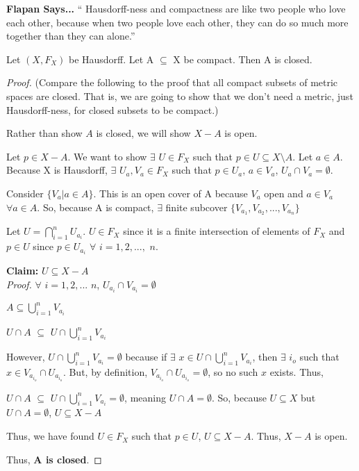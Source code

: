 \textbf{Flapan Says...} `` Hausdorff-ness and compactness are like two people who love each other, because when two people love each other, they can do so much more together than they can alone.'' \\
\begin{theorem}
	Let $(X, F_X)$ be Hausdorff. Let A $\subseteq$ X be compact. Then A is closed. 
\end{theorem}
\begin{proof}
	(Compare the following to the proof that all compact subsets of metric spaces are closed. That is, we are going to show that we don't need a metric, just Hausdorff-ness, for closed subsets to be compact.)
	
	Rather than show $A$ is closed, we will show $X-A$ is open.
	
	Let $p \in X-A$. We want to show $\exists$ $U \in F_X$ such that $p \in U \subseteq X\setminus A$. Let $a \in A$. Because X is Hausdorff, $\exists$ $U_a, V_a \in F_X$ such that $p \in U_a$, $a \in V_a$, $U_a \cap V_a = \emptyset$.
	
	Consider $\{ V_a | a \in A\}$. This is an open cover of A because $V_a$ open and $a \in V_a$ $\forall a \in A$. So, because A is compact, $\exists$ finite subcover $\{ V_{a_1}, V_{a_2}, ..., V_{a_n}\}$
	
	Let $U = \bigcap_{i=1}^{n} U_{a_i}$. $U \in F_X$ since it is a finite intersection of elements of $F_X$ and $p \in U$ since $p \in U_{a_i}$ $\forall$ $i=1, 2, ...,$ $n$.
	
	\textbf{Claim:} $U \subseteq X-A$\\
	\emph{Proof.} $\forall$ $i=1, 2, ...$ $n$, $U_{a_i} \cap V_{a_i} = \emptyset$
	
	$A \subseteq \bigcup_{i=1}^{n} V_{a_i}$
	
	$U \cap A$ $\subseteq$ $U \cap \bigcup_{i=1}^{n} V_{a_i}$
	
	However, $U \cap \bigcup_{i=1}^{n} V_{a_i} = \emptyset$ because if $\exists$ $x \in U \cap \bigcup_{i=1}^{n} V_{a_i}$, then $\exists$ $i_o$ such that $x \in V_{a_{i_o}} \cap U_{a_{i_o}}$. But, by definition, $V_{a_{i_o}} \cap U_{a_{i_o}} = \emptyset$, so no such $x$ exists. Thus,
	
	$U \cap A$ $\subseteq$ $U \cap \bigcup_{i=1}^{n} V_{a_i} = \emptyset$, meaning $U \cap A = \emptyset$. So, because $U \subseteq X$ but $U \cap A = \emptyset$, $U \subseteq X-A$
	
	Thus, we have found $U \in F_X$ such that $p \in U$, $U \subseteq X-A$. Thus, $X-A$ is open.
	
	Thus, \textbf{A is closed}. 
\end{proof}
